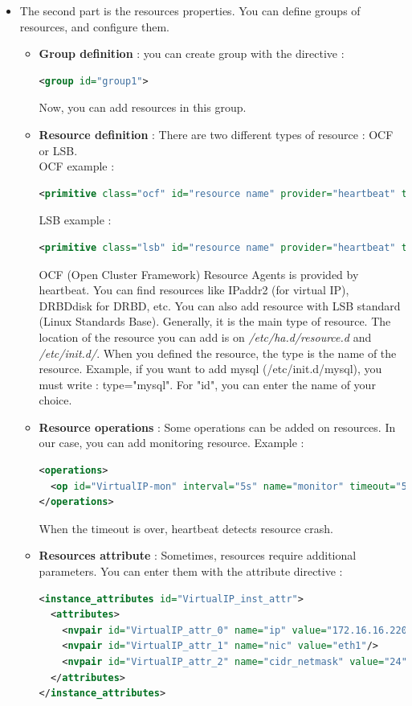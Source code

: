 \documentclass[a4paper,10pt]{report}
\begin{document}
\begin{itemize}
\item The second part is the resources properties. You can define groups of resources, and configure them.

\begin{itemize}
\item \textbf{Group definition} : you can create group with the directive :
\begin{lstlisting}[language=xml]
<group id="group1">
\end{lstlisting}
Now, you can add resources in this group.
\item \textbf{Resource definition} : There are two different types of resource : OCF or LSB.\\
OCF example : 
\begin{lstlisting}[language=xml]
<primitive class="ocf" id="resource name" provider="heartbeat" type="resource-name">
\end{lstlisting}
LSB example : 
\begin{lstlisting}[language=xml]
<primitive class="lsb" id="resource name" provider="heartbeat" type="resource-name">
\end{lstlisting}
OCF (Open Cluster Framework) Resource Agents is provided by heartbeat. You can find resources like IPaddr2 (for virtual IP), DRBDdisk for DRBD, etc.
You can also add resource with LSB standard (Linux Standards Base). Generally, it is the main type of resource. The location of the resource you can add is on \textit{/etc/ha.d/resource.d} and \textit{/etc/init.d/}.
When you defined the resource, the type is the name of the resource. Example, if you want to add mysql (/etc/init.d/mysql), you must write : type="mysql". For "id", you can enter the name of your choice.
\item \textbf{Resource operations} : Some operations can be added on resources. In our case, you can add monitoring resource. Example :
\begin{lstlisting}[language=xml]
<operations>
  <op id="VirtualIP-mon" interval="5s" name="monitor" timeout="5s"/>
</operations>
\end{lstlisting}
When the timeout is over, heartbeat detects resource crash.
\item \textbf{Resources attribute} : Sometimes, resources require additional parameters. You can enter them with the attribute directive :
\begin{lstlisting}[language=xml]
<instance_attributes id="VirtualIP_inst_attr">
  <attributes>
    <nvpair id="VirtualIP_attr_0" name="ip" value="172.16.16.220"/>
    <nvpair id="VirtualIP_attr_1" name="nic" value="eth1"/>
    <nvpair id="VirtualIP_attr_2" name="cidr_netmask" value="24"/>
  </attributes>
</instance_attributes>
\end{lstlisting}


\end{itemize}
\end{itemize}
\end{document}
